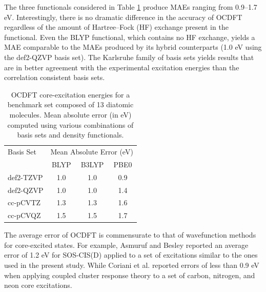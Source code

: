 \documentclass[8.5pt,twoside,twocolumn]{article}
\begin{document}
The three functionals considered in Table \ref{table:OverallPerformance} produce MAEs ranging from 0.9--1.7 eV. Interestingly, there is no dramatic difference in the accuracy of OCDFT regardless of the amount of Hartree--Fock (HF) exchange present in the functional.  Even the BLYP functional, which contains no HF exchange, yields a MAE comparable to the MAEs produced by its hybrid counterparts (1.0 eV using the def2-QZVP basis set). 
The Karlsruhe family of basis sets yields results that are in better agreement with the experimental excitation energies than the correlation consistent basis sets.
\begin{table}[!ht]
\small
\caption{OCDFT core-excitation energies for a benchmark set composed of 13 diatomic molecules.  Mean absolute error (in eV) computed using various combinations of basis sets and density functionals.}
\centering
    \begin{tabular}{lccc}
    \hline
    \hline
Basis Set & \multicolumn{3}{c}{Mean Absolute Error (eV)}  \\
& BLYP & B3LYP & PBE0\\
\hline
def2-TZVP & 1.0 & 1.0 & 0.9 \\
def2-QZVP & 1.0 & 1.0 & 1.4 \\
cc-pCVTZ & 1.3 & 1.3 & 1.6 \\
cc-pCVQZ & 1.5 & 1.5 & 1.7 \\
\hline
\hline
\end{tabular}
\label{table:OverallPerformance}
\end{table}
The average error of OCDFT is commensurate to that of wavefunction methods for core-excited states. For example, Asmuruf and Besley\cite{asmuruf_calculation_2008} reported an average error of 1.2 eV for SOS-CIS(D) applied to a set of excitations similar to the ones used in the present study. While Coriani et al.\cite{coriani_coupled-cluster_2012} reported errors of less than 0.9 eV when applying coupled cluster response theory to a set of carbon, nitrogen, and neon core excitations. 
\end{document}
